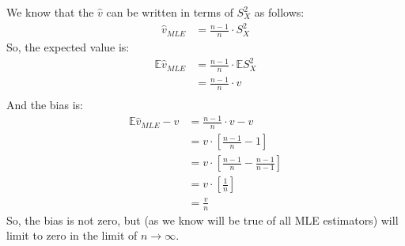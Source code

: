 We know that the $\hat{v}$ can be written in terms of $S_X^2$ as follows:
\begin{align*}
\hat{v}_{MLE} &= \frac{n-1}{n} \cdot S_X^2
\end{align*}
So, the expected value is:
\begin{align*}
\mathbb{E}\hat{v}_{MLE} &= \frac{n-1}{n} \cdot \mathbb{E} S_X^2 \\
&= \frac{n-1}{n} \cdot v \\
\end{align*}
And the bias is:
\begin{align*}
\mathbb{E}\hat{v}_{MLE} - v &= \frac{n-1}{n} \cdot v - v \\
&= v \cdot \left[\frac{n-1}{n} - 1 \right] \\
&= v \cdot \left[\frac{n-1}{n} - \frac{n-1}{n-1} \right] \\
&= v \cdot \left[\frac{1}{n} \right] \\
&= \frac{v}{n}
\end{align*}
So, the bias is not zero, but (as we know will be true of all MLE estimators)
will limit to zero in the limit of $n\rightarrow \infty$.

